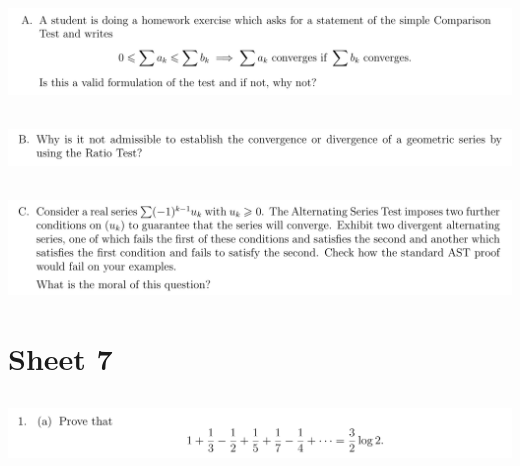 \documentclass[12pt]{article}
\begin{document}
\newpage
\subsection{}
\begin{mdframed}
\includegraphics[width=400pt]{img/analysis--oxford-M2-I-6-extra-A.png}
\end{mdframed}

\newpage
\subsection{}
\begin{mdframed}
\includegraphics[width=400pt]{img/analysis--oxford-M2-I-6-extra-B.png}
\end{mdframed}

\newpage
\subsection{}
\begin{mdframed}
\includegraphics[width=400pt]{img/analysis--oxford-M2-I-6-extra-C.png}
\end{mdframed}




\newpage
\section{Sheet 7}

\subsection{}
\begin{mdframed}
\includegraphics[width=400pt]{img/analysis--oxford-M2-I-7-1-a.png}
\end{mdframed}
\end{document}
